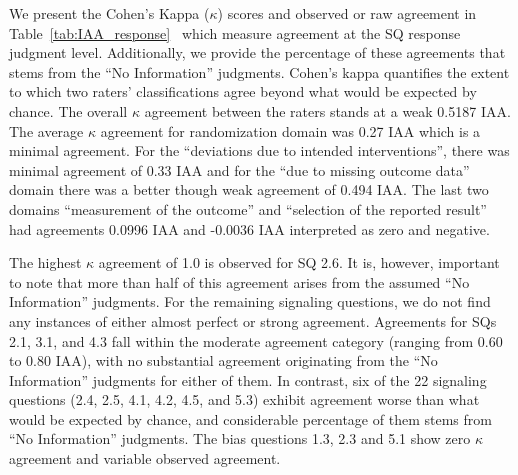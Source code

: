 \documentclass[sn-mathphys,Numbered]{sn-jnl}%
\theoremstyle{thmstyleone}%
\theoremstyle{thmstyletwo}%
\theoremstyle{thmstylethree}%
\begin{document}
We present the Cohen's Kappa ($\kappa$) scores and observed or raw agreement in Table~\ref{tab:IAA_response}~\cite{mchugh2012interrater} which measure agreement at the SQ response judgment level.
Additionally, we provide the percentage of these agreements that stems from the ``No Information'' judgments.
Cohen's kappa quantifies the extent to which two raters' classifications agree beyond what would be expected by chance.
The overall $\kappa$ agreement between the raters stands at a weak 0.5187 IAA.
The average $\kappa$ agreement for randomization domain was 0.27 IAA which is a minimal agreement.
For the ``deviations due to intended interventions'', there was minimal agreement of 0.33 IAA and for the ``due to missing outcome data'' domain there was a better though weak agreement of 0.494 IAA.
The last two domains ``measurement of the outcome'' and ``selection of the reported result'' had agreements 0.0996 IAA and -0.0036 IAA interpreted as zero and negative.



The highest $\kappa$ agreement of 1.0 is observed for SQ 2.6.
It is, however, important to note that more than half of this agreement arises from the assumed ``No Information'' judgments.
For the remaining signaling questions, we do not find any instances of either almost perfect or strong agreement.
Agreements for SQs 2.1, 3.1, and 4.3 fall within the moderate agreement category (ranging from 0.60 to 0.80 IAA), with no substantial agreement originating from the ``No Information'' judgments for either of them.
In contrast, six of the 22 signaling questions (2.4, 2.5, 4.1, 4.2, 4.5, and 5.3) exhibit agreement worse than what would be expected by chance, and considerable percentage of them stems from ``No Information'' judgments.
The bias questions 1.3, 2.3 and 5.1 show zero $\kappa$ agreement and variable observed agreement.
\end{document}
